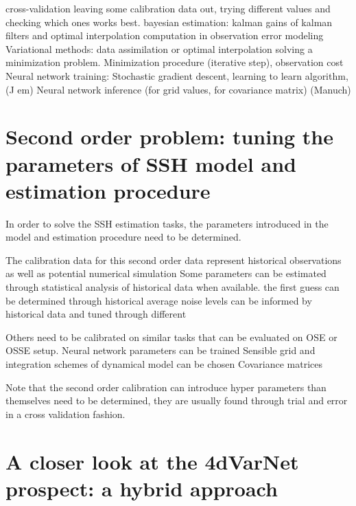 \begin{bibunit}
    cross-validation leaving some calibration data out, trying different values and checking which ones works best.
    bayesian estimation: kalman gains of kalman filters  and optimal interpolation computation in observation error modeling
    Variational methods: data assimilation or optimal interpolation solving a minimization problem.  Minimization procedure (iterative step), observation cost
    Neural network training: Stochastic gradient descent, learning to learn algorithm,  (J em)
    Neural network inference (for grid values, for covariance matrix) (Manuch)


  \section{Second order problem: tuning the parameters of SSH model and estimation procedure}
  In order to solve the SSH estimation tasks, the parameters introduced in the model and estimation procedure need to be determined.


  The calibration data for this second order data represent historical observations as well as potential numerical simulation
  Some parameters can be estimated through statistical analysis of historical data when available.
  the first guess can be determined through historical average
  noise levels can be informed by historical data and tuned through different 

  Others need to be calibrated on similar tasks that can be evaluated on OSE or OSSE setup.
  Neural network parameters can be trained
  Sensible grid and integration schemes of dynamical model can be chosen
  Covariance matrices 


  Note that the second order calibration can introduce hyper parameters than themselves need to be determined,
  they are usually found through trial and error in a cross validation  fashion.


\section{A closer look at the 4dVarNet prospect: a hybrid approach}

\end{bibunit}
